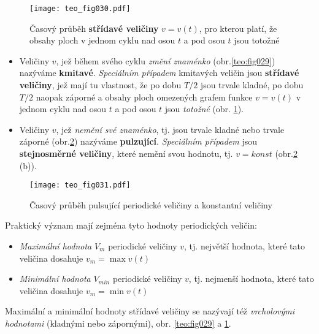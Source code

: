     \begin{figure}[ht!] %
       \centering
       \texttt{[image: teo\_fig030.pdf]}
       \caption{Časový průběh \textbf{střídavé veličiny} $v=v(t)$, pro kterou platí, že obsahy ploch
                v jednom cyklu nad osou $t$ a pod osou $t$ jsou totožné}
       \label{teo:fig030}
    \end{figure}

    \begin{itemize}
      \item Veličiny $v$, jež během svého cyklu \emph{změní znaménko} (obr.\ref{teo:fig029})
            nazýváme \textbf{kmitavé}. \emph{Speciálním případem} kmitavých veličin jsou
            \textbf{střídavé veličiny}, jež mají tu vlastnost, že po dobu $T/2$ jsou trvale kladné,
            po dobu $T/2$ naopak záporné a obsahy ploch omezených grafem funkce $v=v(t)$ v jednom
            cyklu nad osou $t$ a pod osou $t$ jsou \emph{totožné} (obr. \ref{teo:fig030}).
      \item Veličiny $v$, jež \emph{nemění své znaménko}, tj. jsou trvale kladné nebo trvale
            záporné (obr.\ref{teo:fig031}) nazýváme \textbf{pulzující}. \emph{Speciálním případem}
            jsou \textbf{stejnosměrné veličiny}, které nemění svou hodnotu, tj. $v=konst$
            (obr.\ref{teo:fig031} (b)).
    \end{itemize} 

    \begin{figure}[ht!] %
       \centering
       \texttt{[image: teo\_fig031.pdf]}
       \caption{Časový průběh pulsující periodické veličiny a konstantní veličiny}
       \label{teo:fig031}
    \end{figure}

    Praktický význam mají zejména tyto hodnoty periodických veličin:
    \begin{itemize}
      \item \emph{Maximální hodnota} $V_m$ periodické veličiny $v$, tj. největší hodnota, které
            tato veličina dosahuje $v_m=\max v(t)$
      \item \emph{Minimální hodnota} $V_{min}$ periodické veličiny $v$, tj. nejmenší hodnota, které
            tato veličina dosahuje $v_m=\min v(t)$
    \end{itemize}
      
    Maximální a minimální hodnoty střídavé veličiny se nazývají též \emph{vrcholovými hodnotami}
    (kladnými nebo zápornými), obr. \ref{teo:fig029} a \ref{teo:fig030}. 
    
